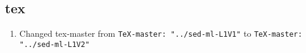 \documentclass{article}
\newcommand{\code}[1]{\texttt{#1}}
\begin{document}
\subsection{tex}

\begin{enumerate}
\item Changed tex-master from  \code{TeX-master: "../sed-ml-L1V1"} to  \code{TeX-master: "../sed-ml-L1V2"}
\end{enumerate}
\end{document}
